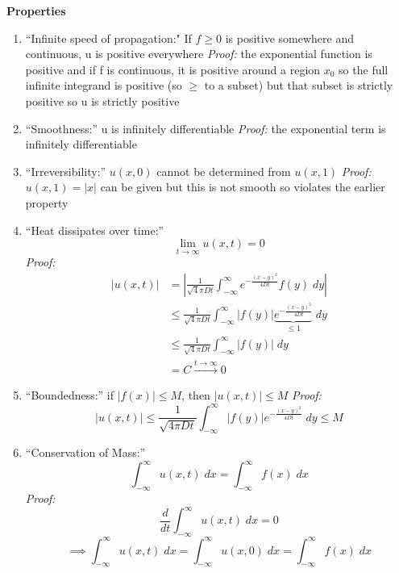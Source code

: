 \documentclass[12pt]{article}
\begin{document}
\textbf{Properties}
\begin{enumerate}
    \item ``Infinite speed of propagation:" If $f \geq 0$ is positive somewhere and continuous, u is positive everywhere
    \emph{Proof:} the exponential function is positive and if f is continuous, it is positive around a region $x_0$ so the full infinite integrand is positive (so $\geq$ to a subset) but that subset is strictly positive so u is strictly positive 
    \item ``Smoothness:'' u is infinitely differentiable 
    \emph{Proof:} the exponential term is infinitely differentiable
    \item ``Irreversibility:'' $u(x, 0)$ cannot be determined from $u(x, 1)$
    \emph{Proof:} $u(x, 1) = |x|$ can be given but this is not smooth so violates the earlier property 
    \item ``Heat dissipates over time:'' 
    \[\lim_{t \to \infty}u(x, t) = 0\]
    \emph{Proof:}
    \begin{align*}
        |u(x, t)| &= \left|\frac{1}{\sqrt4\pi D t} \int_{-\infty}^\infty e^{-\frac{(x - y)^2}{4Dt}} f(y) \; dy\right|\\
        &\leq \frac{1}{\sqrt4\pi D t} \int_{-\infty}^\infty |f(y)| \underbrace{e^{-\frac{(x - y)^2}{4Dt}}}_{\leq 1} \; dy\\
        &\leq \frac{1}{\sqrt4\pi D t} \int_{-\infty}^\infty |f(y)| \; dy\\
        &= C \overset{t \to \infty}{\longrightarrow} 0
    \end{align*}
    \item ``Boundedness:'' if $|f(x)| \leq M$, then $|u(x, t)| \leq M$
    \emph{Proof:}
    \[|u(x, t)| \leq \frac{1}{\sqrt{4\pi Dt}} \int_{-\infty}^{\infty} |f(y)| e^{-\frac{(x - y)^2}{4Dt}} \; dy \leq M\]
    \item ``Conservation of Mass:'' 
    \[\int_{-\infty}^{\infty} u(x, t)\; dx = \int_{-\infty}^{\infty} f(x) \; dx\]
    \emph{Proof:}
    \[\frac{d}{dt}\int_{-\infty}^{\infty} u(x, t)\; dx = 0\] 
    \[\implies \int_{-\infty}^{\infty} u(x, t)\; dx = \int_{-\infty}^{\infty} u(x, 0)\; dx = \int_{-\infty}^{\infty} f(x)\; dx\]
\end{enumerate}
\end{document}
